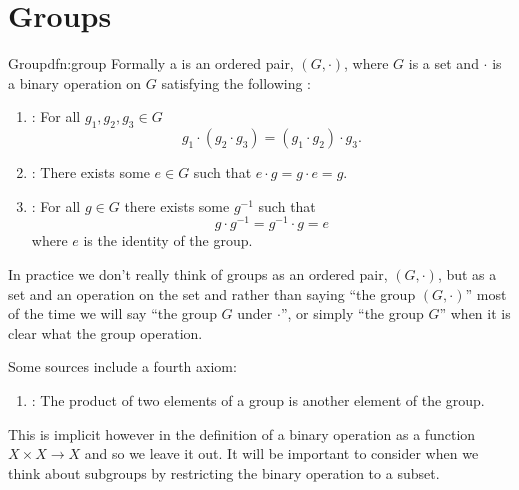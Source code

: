 \documentclass[fleqn]{NotesClass}
\begin{document}
    \section{Groups}
    \begin{dfn}{Group}{dfn:group}
        Formally a  is an ordered pair, \((G, \cdot)\), where \(G\) is a set and \(\cdot\) is a binary operation on \(G\) satisfying the following :
        \begin{enumerate}
            \item {}: For all \(g_1, g_2, g_3 \in G\)
            \begin{equation}
                g_1 \cdot (g_2 \cdot g_3) = (g_1 \cdot g_2) \cdot g_3.
            \end{equation}
            \item {}: There exists some \(e \in G\) such that \(e \cdot g = g \cdot e = g\).
            \item {}: For all \(g \in G\) there exists some \(g^{-1}\) such that
            \begin{equation}
                g\cdot g^{-1} = g^{-1} \cdot g = e
            \end{equation}
            where \(e\) is the identity of the group.
        \end{enumerate}
        \begin{rmk}
            In practice we don't really think of groups as an ordered pair, \((G, \cdot)\), but as a set and an operation on the set and rather than saying \enquote{the group \((G, \cdot)\)} most of the time we will say \enquote{the group \(G\) under \(\cdot\)}, or simply \enquote{the group \(G\)} when it is clear what the group operation.
        \end{rmk}
        
        Some sources include a fourth axiom:
        \begin{enumerate}[resume]
            \item {}: The product of two elements of a group is another element of the group.
        \end{enumerate}
        This is implicit however in the definition of a binary operation as a function \(X \times X \to X\) and so we leave it out.
        It will be important to consider when we think about subgroups by restricting the binary operation to a subset.
    \end{dfn}
    
\end{document}
